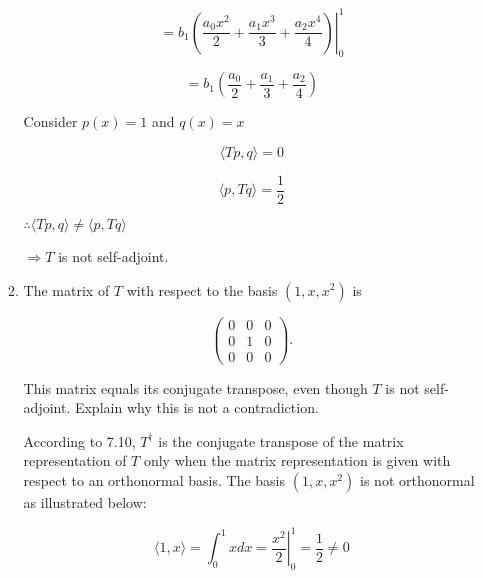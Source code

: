 \documentclass[fleqn]{article}
\makeatletter
\newenvironment{equationCenter}{\@fleqnfalse\begin{equation*}}{\end{equation*}}
\makeatother
\begin{document}
\begin{enumerate}[nolistsep]
\begin{enumerate}[nolistsep]
			\begin{equation*}
				= b_1\left.\left(\frac{a_0x^2}{2} + \frac{a_1x^3}{3} + \frac{a_2x^4}{4}\right)\right\vert_{0}^{1}
			\end{equation*}
			
			\begin{equation*}
				= b_1\left(\frac{a_0}{2} + \frac{a_1}{3} + \frac{a_2}{4}\right)
			\end{equation*}
			
			Consider $p(x) = 1$ and $q(x) = x$
			
			\begin{equation*}
				\langle Tp, q \rangle = 0
			\end{equation*}
			
			\begin{equation*}
				\langle p, Tq \rangle = \frac{1}{2}
			\end{equation*}
			
			$\therefore \langle Tp, q \rangle \neq \langle p, Tq \rangle$
			
			$\Rightarrow T$ is not self-adjoint.
			
			\item The matrix of $T$ with respect to the basis $(1,x,x^2)$ is
			
			\begin{equationCenter}
				\begin{pmatrix}
					0 & 0 & 0\\
					0 & 1 & 0\\
					0 & 0 & 0
				\end{pmatrix}.
			\end{equationCenter}
			
			This matrix equals its conjugate transpose, even though $T$ is not self-adjoint. Explain why this is not a contradiction.
			
			According to 7.10, $T^{\dag}$ is the conjugate transpose of the matrix representation of $T$ only when the matrix representation is given with respect to an orthonormal basis. The basis $(1,x,x^2)$ is not orthonormal as illustrated below:
			
			\begin{equation*}
				\langle 1, x \rangle = \int_{0}^{1}{xdx} = \left.\frac{x^2}{2}\right\vert_{0}^{1} = \frac{1}{2} \neq 0
			\end{equation*}
		\end{enumerate}
	\end{enumerate}
\end{document}
